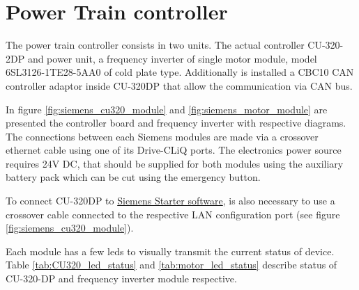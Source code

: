 \chapter{Power Train controller}
The power train controller consists in two units. The actual controller CU-320-2DP and power unit, a frequency inverter of single motor module, model 6SL3126-1TE28-5AA0 of cold plate type. Additionally is installed a CBC10 CAN controller adaptor inside CU-320DP that allow the communication via CAN bus.

In figure \ref{fig:siemens_cu320_module} and \ref{fig:siemens_motor_module} are presented the controller board and frequency inverter with respective diagrams.
The connections between each Siemens modules are made via a crossover ethernet cable using one of its Drive-CLiQ ports. The electronics power source requires 24V \gls{DC}, that should be supplied for both modules using the auxiliary battery pack which can be  cut using the emergency button.


To connect CU-320DP to \href{https://w3.siemens.com/mcms/mc-solutions/en/engineering-software/starter-commissioning-tool/pages/starter-commissioning-tool.aspx}{Siemens Starter software}, is also necessary to use a crossover cable connected to the respective LAN configuration port (see figure \ref{fig:siemens_cu320_module}). 

Each module has a few leds to visually transmit the current status of device. Table \ref{tab:CU320_led_status} and \ref{tab:motor_led_status} describe status of CU-320-DP and frequency inverter module respective.


